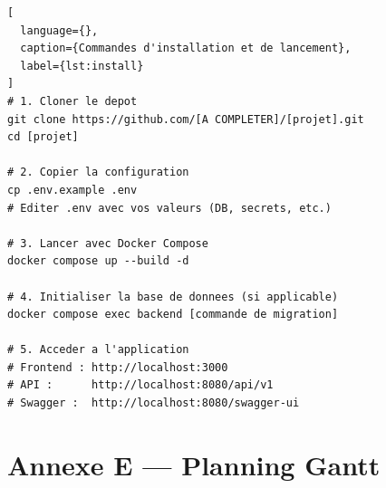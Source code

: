 \begin{lstlisting}[
  language={},
  caption={Commandes d'installation et de lancement},
  label={lst:install}
]
# 1. Cloner le depot
git clone https://github.com/[A COMPLETER]/[projet].git
cd [projet]

# 2. Copier la configuration
cp .env.example .env
# Editer .env avec vos valeurs (DB, secrets, etc.)

# 3. Lancer avec Docker Compose
docker compose up --build -d

# 4. Initialiser la base de donnees (si applicable)
docker compose exec backend [commande de migration]

# 5. Acceder a l'application
# Frontend : http://localhost:3000
# API :      http://localhost:8080/api/v1
# Swagger :  http://localhost:8080/swagger-ui
\end{lstlisting}

\section{Annexe E — Planning Gantt}
\label{ann:gantt}


